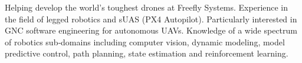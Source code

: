 

\begin{cvparagraph}

Helping develop the world's toughest drones at Freefly Systems. Experience in the field of legged robotics and sUAS (PX4 Autopilot). Particularly interested in GNC software engineering for autonomous UAVs. Knowledge of a wide spectrum of robotics sub‑domains including computer vision, dynamic modeling, model predictive control, path planning, state estimation and reinforcement learning.

\end{cvparagraph}
